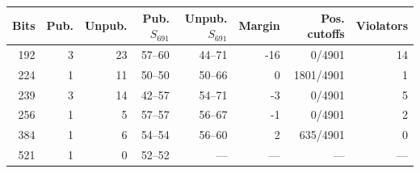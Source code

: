 \begin{tabular}{rrrrrrrr}\toprule
Bits & Pub. & Unpub. & Pub. $S_{691}$ & Unpub. $S_{691}$ & Margin & Pos. cutoffs & Violators\\\midrule
192 & 3 & 23 & 57--60 & 44--71 & -16 & 0/4901 & 14\\
224 & 1 & 11 & 50--50 & 50--66 & 0 & 1801/4901 & 1\\
239 & 3 & 14 & 42--57 & 54--71 & -3 & 0/4901 & 5\\
256 & 1 & 5 & 57--57 & 56--67 & -1 & 0/4901 & 2\\
384 & 1 & 6 & 54--54 & 56--60 & 2 & 635/4901 & 0\\
521 & 1 & 0 & 52--52 & --- & --- & --- & ---\\
\bottomrule\end{tabular}
